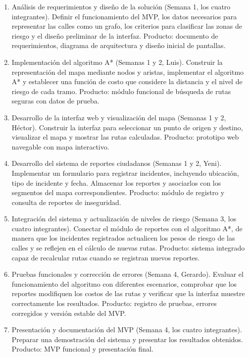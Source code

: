 \documentclass[11pt]{article}
\begin{document}
\begin{enumerate}[leftmargin=1.5em,itemsep=4pt]
  \item Análisis de requerimientos y diseño de la solución (Semana 1, los cuatro integrantes).
    Definir el funcionamiento del MVP, los datos necesarios para representar las calles como un
    grafo, los criterios para clasificar las zonas de riesgo y el diseño preliminar de la interfaz.
    Producto: documento de requerimientos, diagrama de arquitectura y diseño inicial de pantallas.
  \item Implementación del algoritmo A* (Semanas 1 y 2, Luis). Construir la representación del mapa
    mediante nodos y aristas, implementar el algoritmo A* y establecer una función de costo que
    considere la distancia y el nivel de riesgo de cada tramo. Producto: módulo funcional de
    búsqueda de rutas seguras con datos de prueba.
  \item Desarrollo de la interfaz web y visualización del mapa (Semanas 1 y 2, Héctor). Construir la
    interfaz para seleccionar un punto de origen y destino, visualizar el mapa y mostrar las rutas
    calculadas. Producto: prototipo web navegable con mapa interactivo.
  \item Desarrollo del sistema de reportes ciudadanos (Semanas 1 y 2, Yeni). Implementar un
    formulario para registrar incidentes, incluyendo ubicación, tipo de incidente y fecha.
    Almacenar los reportes y asociarlos con los segmentos del mapa correspondientes. Producto:
    módulo de registro y consulta de reportes de inseguridad.
  \item Integración del sistema y actualización de niveles de riesgo (Semana 3, los cuatro
    integrantes). Conectar el módulo de reportes con el algoritmo A*, de manera que los incidentes
    registrados actualicen los pesos de riesgo de las calles y se reflejen en el cálculo de nuevas
    rutas. Producto: sistema integrado capaz de recalcular rutas cuando se registran nuevos
    reportes.
  \item Pruebas funcionales y corrección de errores (Semana 4, Gerardo). Evaluar el funcionamiento
    del algoritmo con diferentes escenarios, comprobar que los reportes modifiquen los costos de las
    rutas y verificar que la interfaz muestre correctamente los resultados. Producto: registro de
    pruebas, errores corregidos y versión estable del MVP.
  \item Presentación y documentación del MVP (Semana 4, los cuatro integrantes). Preparar una
    demostración del sistema y presentar los resultados obtenidos. Producto: MVP funcional y
    presentación final.
\end{enumerate}
\end{document}

